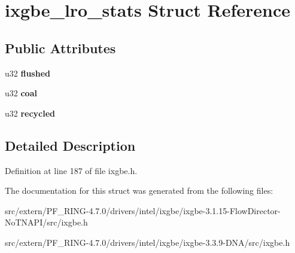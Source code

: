 \hypertarget{structixgbe__lro__stats}{
\section{ixgbe\_\-lro\_\-stats Struct Reference}
\label{structixgbe__lro__stats}
}
\subsection*{Public Attributes}
\begin{DoxyCompactItemize}
\item 
\hypertarget{structixgbe__lro__stats_a5cb679d88018db8884f11b432fbf2c07}{
u32 {\bfseries flushed}}
\label{structixgbe__lro__stats_a5cb679d88018db8884f11b432fbf2c07}

\item 
\hypertarget{structixgbe__lro__stats_ab7bf5d70ab8f90e63c58e759e098d52b}{
u32 {\bfseries coal}}
\label{structixgbe__lro__stats_ab7bf5d70ab8f90e63c58e759e098d52b}

\item 
\hypertarget{structixgbe__lro__stats_a3bd352255260172ee3f5eae9ebf696af}{
u32 {\bfseries recycled}}
\label{structixgbe__lro__stats_a3bd352255260172ee3f5eae9ebf696af}

\end{DoxyCompactItemize}


\subsection{Detailed Description}


Definition at line 187 of file ixgbe.h.



The documentation for this struct was generated from the following files:\begin{DoxyCompactItemize}
\item 
src/extern/PF\_\-RING-\/4.7.0/drivers/intel/ixgbe/ixgbe-\/3.1.15-\/FlowDirector-\/NoTNAPI/src/ixgbe.h\item 
src/extern/PF\_\-RING-\/4.7.0/drivers/intel/ixgbe/ixgbe-\/3.3.9-\/DNA/src/ixgbe.h\end{DoxyCompactItemize}
